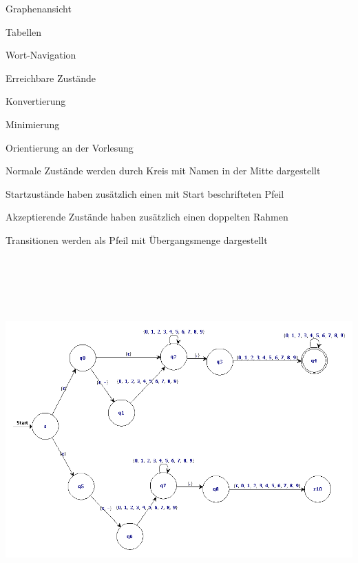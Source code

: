 



{
    \begin{itemgroup}{}
	\item Graphenansicht
	\item Tabellen
	\item Wort-Navigation
	\item Erreichbare Zustände
	\item Konvertierung
	\item Minimierung
	\end{itemgroup}

	\vfill{}
    
}

{
    \begin{itemgroup}{}
	\item Orientierung an der Vorlesung
	\item Normale Zustände werden durch Kreis mit Namen in der Mitte dargestellt
	\begin{itemgroup}{}
		\item Startzustände haben zusätzlich einen mit Start beschrifteten Pfeil
		\item Akzeptierende Zustände haben zusätzlich einen doppelten Rahmen
	\end{itemgroup}
	\item Transitionen werden als Pfeil mit Übergangsmenge dargestellt
	\end{itemgroup}

	\vfill{}
}

{
  \begin{center}
    \includegraphics[height=14cm]{../images/enfa_example.png}
  \end{center}
}

